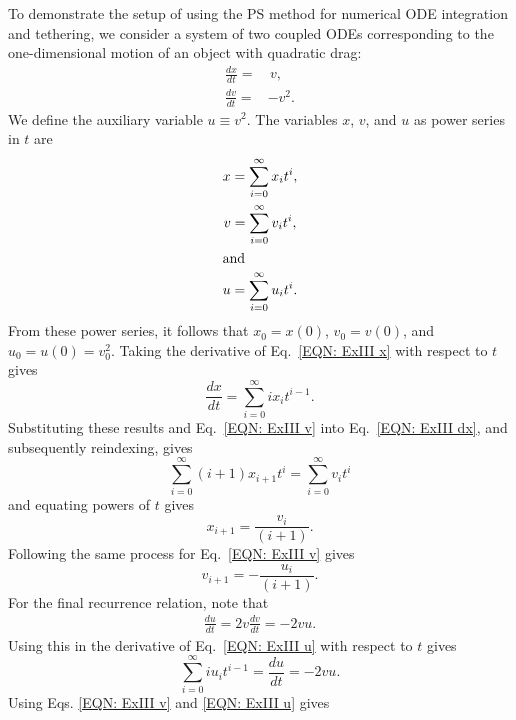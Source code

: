 \documentclass{article}
\begin{document}
To demonstrate the setup of using the PS method for numerical ODE integration and tethering, we consider a system of two coupled ODEs corresponding to the one-dimensional motion of an object with quadratic drag:
    \begin{align}
            \frac{dx}{dt}=&\,v,\label{EQN: ExIII dx} \\
            \frac{dv}{dt}=&-v^2\nonumber.
    \end{align}
We define the auxiliary variable $u\equiv v^2$. The variables $x$, $v$, and $u$ as power series in $t$ are
    \begin{gather}
        x=\sum_{i=0}^\infty x_it^i \label{EQN: ExIII x},\\
        v=\sum_{i=0}^\infty v_it^i \label{EQN: ExIII v},\\
     \intertext{and}    
        u=\sum_{i=0}^\infty u_it^i  \label{EQN: ExIII u}.
    \end{gather}
From these power series, it follows that $x_0=x(0)$, $v_0=v(0)$, and $u_0=u(0)=v_0^2$. Taking the derivative of Eq.~\eqref{EQN: ExIII x} with respect to $t$ gives
    \begin{equation*}
        \frac{dx}{dt}=\sum_{i=0}^\infty ix_{i}t^{i-1}.
    \end{equation*}
Substituting these results and Eq.~\eqref{EQN: ExIII v} into Eq.~\eqref{EQN: ExIII dx}, and subsequently reindexing, gives  
    \begin{equation*}\label{EQN: ExIII sumvsumx}
        \sum_{i=0}^\infty (i+1)x_{i+1}t^{i}=\sum_{i=0}^\infty v_it^i  
    \end{equation*}
and equating powers of $t$ gives
    \begin{equation}\label{EQN: ExIII xi}
        x_{i+1}= \frac{v_i}{(i+1)}. 
    \end{equation}
Following the same process for Eq.~\eqref{EQN: ExIII v} gives
    \begin{equation}\label{EQN: ExIII vi}
        v_{i+1}= -\frac{u_i}{(i+1)}. 
    \end{equation}
For the final recurrence relation, note that
    \begin{align*}
        \frac{du}{dt}=2v\frac{dv}{dt}=-2vu.
    \end{align*}
Using this in the derivative of Eq.~\eqref{EQN: ExIII u} with respect to $t$ gives 
    \begin{equation*}
         \sum_{i=0}^\infty iu_it^{i-1}=\frac{du}{dt}=-2vu. 
    \end{equation*} 
Using Eqs. \eqref{EQN: ExIII v} and \eqref{EQN: ExIII u} gives
\end{document}

